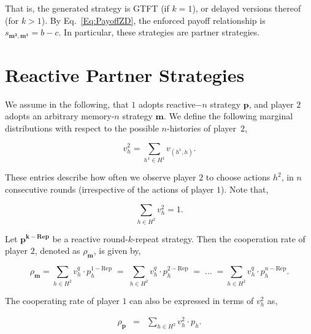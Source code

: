 \documentclass{article}
\theoremstyle{definition}
\begin{document}
That is, the generated strategy is GTFT (if $k\!=\!1$), or delayed versions
thereof (for $k\!>\!1$). By Eq.~\eqref{Eq:PayoffZD}, the enforced payoff
relationship is $s_{\mathbf{m^2}, \mathbf{m^1}}\!=\!b\!-\!c$. In particular, these
strategies are partner strategies.\\

\section{Reactive Partner Strategies}\label{section:reactive_strategies}

We assume in the following, that $1$ adopts reactive$-n$ strategy $\mathbf{p}$,
and player $2$ adopts an arbitrary memory-$n$ strategy $\mathbf{m}$. We define
the following marginal distributions with respect to the possible $n$-histories
of player~$2$,

\begin{equation}\label{Eq:marginal_distributions}
\displaystyle v^2_{h} = \sum_{h^1\in H^1} v_{(h^1, h)}.
\end{equation}

These entries describe how often we observe player $2$ to choose actions $h^2$,
in $n$ consecutive rounds (irrespective of the actions of player $1$). Note
that,

\begin{equation}\label{eq:normalization_marginal_distributions}
  \displaystyle \sum_{h \in H^2} v^2_{h} = 1.
\end{equation}

Let $\mathbf{p^{k - \text{Rep}}}$ be a reactive round-$k$-repeat strategy. Then
the cooperation rate of player $2$, denoted as $\rho_\mathbf{m}$, is given by,

\begin{equation}\label{Eq:coplayer_cooperation_expr}
  \rho_\mathbf{m} = \sum_{h \in H^{2}} v^q_{h} \cdot p^{1 - \text{Rep}}_{h} \; = \; \sum_{h \in H^{2}} v^q_{h} \cdot p^{2 - \text{Rep}}_{h} \; = \; \dots \; = \sum_{h \in H^{2}} v^q_{h} \cdot p^{n - \text{Rep}}_{h}.
\end{equation}

The cooperating rate of player $1$ can also be expressed in terms of $v^2_{h}$ as,

\begin{equation} \label{Eq:rhop_alln}
  \begin{array}{lll}
    \rho_\mathbf{p} &= &\displaystyle \sum_{h \in H^2} v^2_{h} \cdot p_{h}.
  \end{array}
\end{equation}
\end{document}
